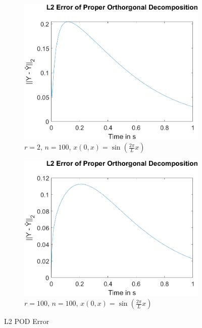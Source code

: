 \begin{figure}[H]
\begin{subfigure}[b]{0.5\textwidth}
\centering
\includegraphics[width=\textwidth]{images/L2_Proper Orthorgonal Decomposition_2_100sin}
\caption{ $r=2$, $n=100$, $x(0, x) = \sin(\frac{2\pi}{L}x)$}
\label{fig:fig-pod-2-100-sina}
\end{subfigure}
\begin{subfigure}[b]{0.5\textwidth}
\centering
\includegraphics[width=\textwidth]{images/L2_Proper Orthorgonal Decomposition_100_100sin}
\caption{$r=100$, $n=100$, $x(0, x) = \sin(\frac{2\pi}{L}x)$}
\label{fig:fig-pod-100-100-sinb}
\end{subfigure}
\label{fig-pod-100-sin}
\caption{L2 POD Error}
\end{figure}


